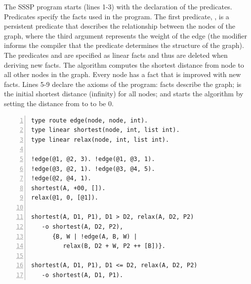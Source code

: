 The SSSP program starts (lines 1-3) with the declaration of the predicates.
Predicates specify the facts used in the program. The first predicate,
, is a persistent predicate that describes the
relationship between the nodes of the graph, where the third argument
represents the weight of the edge (the  modifier
informs the compiler that the  predicate
determines the structure of the graph).  The predicates
 and  are specified as linear facts
and thus are deleted when deriving new facts.  The algorithm computes
the shortest distance from node  to all other nodes in the
graph. Every node has a  fact that is improved with
new  facts.  Lines 5-9 declare the axioms of the
program:  facts describe the graph;  is the initial shortest distance (infinity) for all
nodes; and  starts the algorithm by
setting the distance from  to  to be 0.

\begin{topfig}
\scriptsize\begin{Verbatim}[numbers=left]
type route edge(node, node, int).
type linear shortest(node, int, list int).
type linear relax(node, int, list int).

!edge(@1, @2, 3). !edge(@1, @3, 1).
!edge(@3, @2, 1). !edge(@3, @4, 5).
!edge(@2, @4, 1).
shortest(A, +00, []).
relax(@1, 0, [@1]).

shortest(A, D1, P1), D1 > D2, relax(A, D2, P2)
   -o shortest(A, D2, P2),
      {B, W | !edge(A, B, W) |
         relax(B, D2 + W, P2 ++ [B])}.

shortest(A, D1, P1), D1 <= D2, relax(A, D2, P2)
   -o shortest(A, D1, P1).
\end{Verbatim}
\end{topfig}

